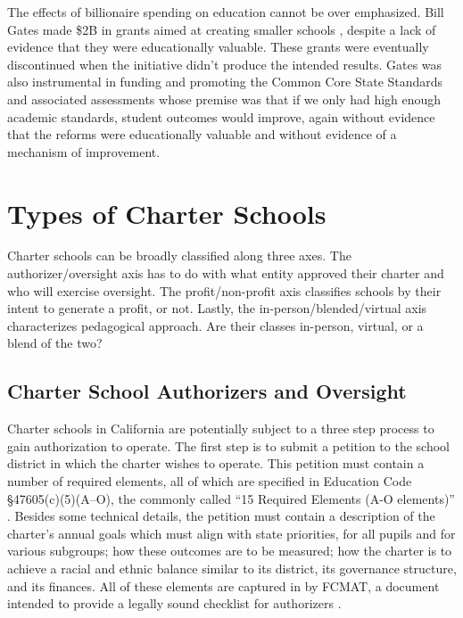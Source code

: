 The effects of billionaire spending on education cannot be over emphasized. Bill Gates made \$2B in grants aimed at creating smaller schools \parencite[11]{Gates2009}, despite a lack of evidence that they were educationally valuable. These grants were eventually discontinued when the initiative didn't produce the intended results. Gates was also instrumental in funding and promoting the Common Core State Standards and associated assessments whose premise was that if we only had high enough academic standards, student outcomes would improve, again without evidence that the reforms were educationally valuable and without evidence of a mechanism of improvement.

\section{Types of Charter Schools}\label{sec:types-charters}\indent

Charter schools can be broadly classified along three axes. The authorizer/oversight axis has to do with what entity approved their charter and who will exercise oversight. The profit/non-profit axis classifies schools by their intent to generate a profit, or not.
Lastly, the in-person/blended/virtual axis characterizes pedagogical approach. Are their classes in-person, virtual, or a blend of the two?

\subsection{Charter School Authorizers and Oversight}\indent

Charter schools in California are potentially subject to a three step process to gain authorization to operate. The first step is to submit a petition to the school district in which the charter wishes to operate. This petition must contain a number of required elements, all of which are specified in Education Code §47605(c)(5)(A–O), the commonly called ``15 Required Elements (A-O elements)'' \parencite[89]{Aguinaldo.etal2021}. Besides some technical details, the petition must contain a description of the charter's annual goals which must align with state priorities, for all pupils and for various subgroups; how these outcomes are to be measured; how the charter is to achieve a racial and ethnic balance similar to its district, its governance structure, and its finances. All of these elements are captured in \textit{} by FCMAT, a document intended to provide a legally sound checklist for authorizers \parencite{FCMAT2022}.  %

